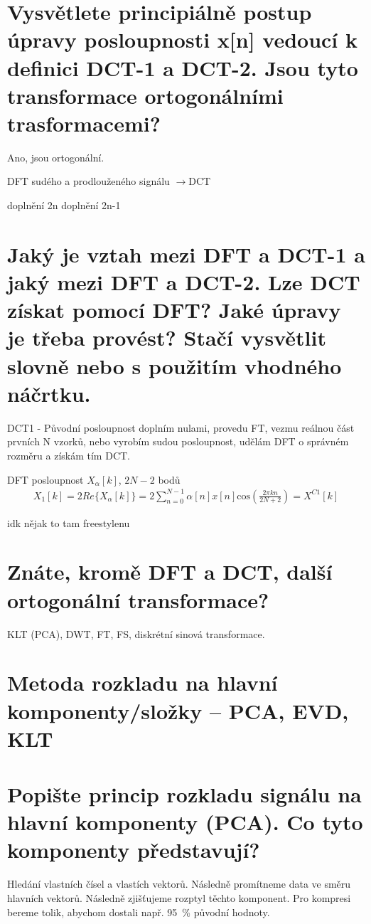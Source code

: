 \documentclass[a4paper,12pt]{article}   %
\newcommand{\rrarr}{$\rightarrow$}
\newcommand{\mt}[1]{$#1$}
\newcommand{\okruh}[1]{\section*{\Large #1}}
\begin{document}
\section{Vysvětlete principiálně postup úpravy posloupnosti x[n] vedoucí k definici DCT-1 a DCT-2. Jsou tyto transformace ortogonálními trasformacemi?}
Ano, jsou ortogonální. 

DFT sudého a prodlouženého signálu \rrarr DCT
\begin{outline}[enumerate]
        \1 doplnění 2n
        \1 doplnění 2n-1
\end{outline}


\section{Jaký je vztah mezi DFT a DCT-1 a jaký mezi DFT a DCT-2. Lze DCT získat pomocí DFT? Jaké úpravy je třeba provést? Stačí vysvětlit slovně nebo s použitím vhodného náčrtku.}

DCT1 - Původní posloupnost doplním nulami, provedu FT, vezmu reálnou část prvních N vzorků, nebo vyrobím sudou posloupnost, udělám DFT o správném rozměru a získám tím DCT.

DFT posloupnost \mt{X_\alpha[k]}, \mt{2N-2} bodů
\begin{align*}
        X_1[k] = 2Re\{X_\alpha[k]\} = 2\sum_{n=0}^{N-1}\alpha[n]x[n]\text{cos}\left(\frac{2\pi kn}{2N+2}\right) = X^{C1}[k]
\end{align*}

idk nějak to tam freestylenu


\section{Znáte, kromě DFT a DCT, další ortogonální transformace?}
KLT (PCA), DWT, FT, FS, diskrétní sinová transformace.


\clearpage 

\okruh{Metoda rozkladu na hlavní komponenty/složky – PCA, EVD, KLT}

\section{Popište princip rozkladu signálu na hlavní komponenty (PCA). Co tyto komponenty představují?}
Hledání vlastních čísel a vlastích vektorů. Následně promítneme data ve směru hlavních vektorů. Následně zjišťujeme rozptyl těchto komponent. Pro kompresi bereme tolik, abychom dostali např. 95~\% původní hodnoty.
\end{document}
